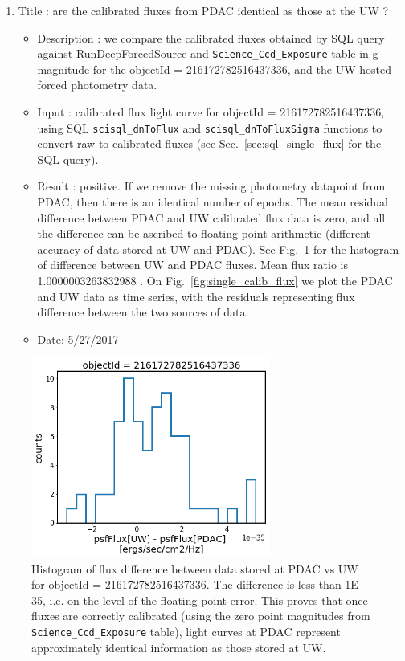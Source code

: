\documentclass[DM,lsstdraft,toc,usenatbib]{lsstdoc}
\begin{document}
\begin{enumerate}
      \item Title : are the calibrated fluxes from PDAC identical as those at the UW ? 
    \begin{itemize}
      \item Description : we compare the calibrated fluxes obtained by SQL query against RunDeepForcedSource and \verb|Science_Ccd_Exposure| table in g-magnitude for the objectId = 216172782516437336, and the UW hosted forced photometry data. 
      \item Input : calibrated flux light curve for objectId = 216172782516437336, using SQL \verb|scisql_dnToFlux| and \verb|scisql_dnToFluxSigma| functions to convert raw to calibrated fluxes (see Sec.~\ref{sec:sql_single_flux} for the SQL query).
      \item Result :  positive. If we remove the missing photometry datapoint from PDAC, then there is an identical number of epochs. The mean residual difference between PDAC and UW calibrated flux data is zero, and all the difference can be ascribed to floating point arithmetic (different accuracy of data stored at UW and PDAC). See Fig.~\ref{fig:single_flux_difference} for the histogram of difference between UW and PDAC fluxes. Mean flux ratio is 1.0000003263832988 . On Fig.~\ref{fig:single_calib_flux} we plot the PDAC and UW data as time series, with the residuals representing flux difference between the two sources of data. 
      \item Date: 5/27/2017
    \end{itemize}

\end{enumerate}



\begin{figure}
\begin{centering}
\includegraphics[width=0.7\textwidth]{figs/Single_UW_vs_PDAC_flux}
\cprotect\caption{Histogram of flux difference between data stored at PDAC vs UW for objectId = 216172782516437336. The difference is less than 1E-35,  i.e. on the level of the floating point error.  This proves that once fluxes are correctly calibrated (using the zero point magnitudes from \verb|Science_Ccd_Exposure| table), light curves at PDAC represent approximately identical information as those stored at UW.}
\label{fig:single_flux_difference}
\end{centering}
\end{figure}
\end{document}
